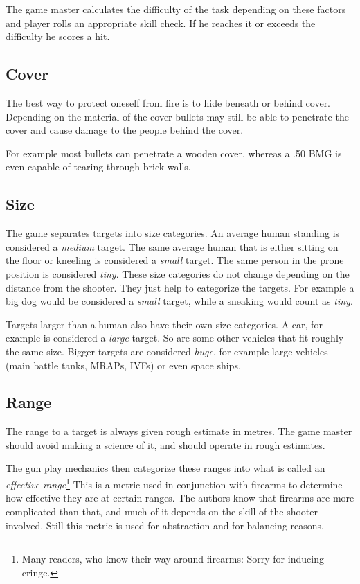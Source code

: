 The game master calculates the difficulty of the task depending on these factors
and player rolls an appropriate skill check. If he reaches it or exceeds the
difficulty he scores a hit.

\subsection{Cover}
\label{sub:6-Cover}

The best way to protect oneself from fire is to hide beneath or behind cover.
Depending on the material of the cover bullets may still be able to penetrate
the cover and cause damage to the people behind the cover.

For example most bullets can penetrate a wooden cover, whereas a .50 BMG is even
capable of tearing through brick walls.

\subsection{Size}
\label{sub:6-Size}

The game separates targets into size categories. An average human standing is
considered a \emph{medium} target. The same average human that is either sitting
on the floor or kneeling is considered a \emph{small} target. The same person
in the prone position is considered \emph{tiny}. These size categories do not
change depending on the distance from the shooter. They just help to categorize
the targets. For example a big dog would be considered a \emph{small} target,
while a sneaking would count as \emph{tiny}.

Targets larger than a human also have their own size categories. A car, for
example is considered a \emph{large} target. So are some other vehicles that
fit roughly the same size. Bigger targets are considered \emph{huge}, for
example large vehicles (main battle tanks, MRAPs, IVFs) or even space ships.

\subsection{Range}
\label{sub:6-Range}

The range to a target is always given rough estimate in metres. The game master
should avoid making a science of it, and should operate in rough estimates.

The gun play mechanics then categorize these ranges into what is called an
\emph{effective range}\footnote{Many readers, who know their way around
  firearms: Sorry for inducing cringe.} This is a metric used in conjunction
with firearms to determine how effective they are at certain ranges. The authors
know that firearms are more complicated than that, and much of it depends on the
skill of the shooter involved. Still this metric is used for abstraction and for
balancing reasons.


